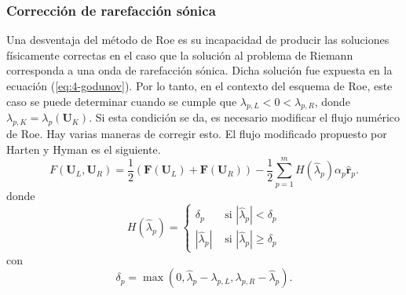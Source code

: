 \subsubsection{Corrección de rarefacción sónica}
Una desventaja del método de Roe es su incapacidad de producir las soluciones físicamente correctas en el caso que la solución al problema de Riemann corresponda a una onda de rarefacción sónica. Dicha solución fue expuesta en la ecuación (\ref{eq:4-godunov}). Por lo tanto, en el contexto del esquema de Roe, este caso se puede determinar cuando se cumple que $\lambda_{p,L} < 0 < \lambda_{p,R}$, donde $\lambda_{p,K} = \lambda_{p}(\mathbf{{U}}_K)$. Si esta condición se da, es necesario modificar el flujo numérico de Roe. Hay varias maneras de corregir esto. El flujo modificado propuesto por Harten y Hyman
 es el siguiente.
\begin{equation}
	F(\mathbf{U}_L, \mathbf{U}_R) = \frac{1}{2}\left(\mathbf{F}(\mathbf{U}_L) +\mathbf{F}(\mathbf{U}_R)\right) - 
	\frac{1}{2}\sum_{p=1}^{m}H(\hat{\lambda}_{p})\alpha_{p}\mathbf{\hat{r}}_{p}.
	\label{eq:flux-HH-fix}
\end{equation}
donde
\begin{equation}
	H(\hat{\lambda}_{p})=
	\begin{cases}
		\delta_{p} & \text{ si } |\hat{\lambda}_p| < \delta_{p}\\
		|\hat{\lambda}_p| & \text{ si } |\hat{\lambda}_p| \geq \delta_{p}
	\end{cases}
\end{equation}
con
\begin{equation}
	\delta_{p} = \max(0, \hat{\lambda}_p - \lambda_{p,L}, \lambda_{p,R}- \hat{\lambda}_p).
\end{equation}